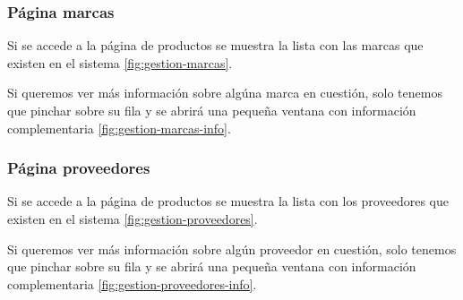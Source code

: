 \subsubsection{Página marcas}

Si se accede a la página de productos se muestra la lista con las marcas que existen en el sistema \ref{fig:gestion-marcas}.


Si queremos ver más información sobre algúna marca en cuestión, solo tenemos que pinchar sobre su fila y se abrirá una pequeña ventana con información complementaria \ref{fig:gestion-marcas-info}.


\subsubsection{Página proveedores}

Si se accede a la página de productos se muestra la lista con los proveedores que existen en el sistema \ref{fig:gestion-proveedores}.


Si queremos ver más información sobre algún proveedor en cuestión, solo tenemos que pinchar sobre su fila y se abrirá una pequeña ventana con información complementaria \ref{fig:gestion-proveedores-info}.

